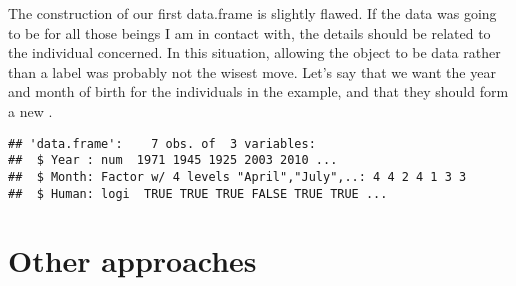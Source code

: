 The construction of our first data.frame is slightly flawed. If the  data was going to be for all those beings I am in contact with, the details should be related to the individual concerned. In this situation, allowing the  object to be data rather than a label was probably not the wisest move. Let's say that we want the year and month of birth for the individuals in the example, and that they should form a new . 
\begin{knitrout}
\color{fgcolor}\begin{kframe}
\begin{alltt}
 \hlkwb{=} \hlstd{(}\hlstd{,} \hlstd{,} \hlstd{,} \hlstd{,} \hlstd{,} \hlstd{,} \hlstd{)}
 \hlkwb{=} \hlstd{(}\hlstd{,} \hlstd{,} \hlstd{,} \hlstd{,} \hlstd{,} \hlstd{,} \hlstd{)}
 \hlkwb{=}   
\end{alltt}
\begin{verbatim}
## 'data.frame':	7 obs. of  3 variables:
##  $ Year : num  1971 1945 1925 2003 2010 ...
##  $ Month: Factor w/ 4 levels "April","July",..: 4 4 2 4 1 3 3
##  $ Human: logi  TRUE TRUE TRUE FALSE TRUE TRUE ...
\end{verbatim}
\end{kframe}
\end{knitrout}
 
\section{Other approaches} 
 
